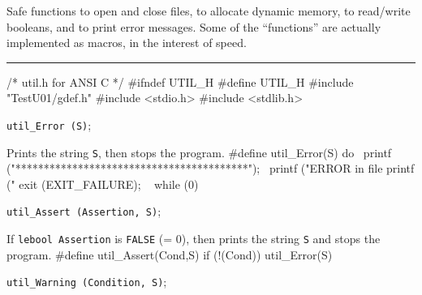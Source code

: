 
Safe functions to open and close files, to allocate dynamic memory,
to read/write booleans, and to print error messages. 
Some of the ``functions'' are actually implemented as macros, in the
interest of speed.

\bigskip\hrule
\code\hide
/* util.h  for ANSI C */
#ifndef UTIL_H
#define UTIL_H
\endhide
#include "TestU01/gdef.h"
#include <stdio.h>
#include <stdlib.h>
\endcode





\noindent 
{\tt util\_Error (S)};

 \tab  Prints the string {\tt S}, then stops the program.
 \endtab
\code
\hide
#define util_Error(S) do { \
   printf ("\n\n******************************************\n"); \
   printf ("ERROR in file %
   printf ("%
   exit (EXIT_FAILURE); \
   } while (0)
\endhide
\endcode

\noindent 
{\tt util\_Assert (Assertion, S)};

 \tab  If {\tt lebool Assertion} is {\tt FALSE} (= 0), 
  then prints the string {\tt S} and stops the program.
 \endtab
\code
\hide
#define util_Assert(Cond,S) if (!(Cond)) util_Error(S)
\endhide
\endcode

\noindent 
{\tt util\_Warning (Condition, S)};


